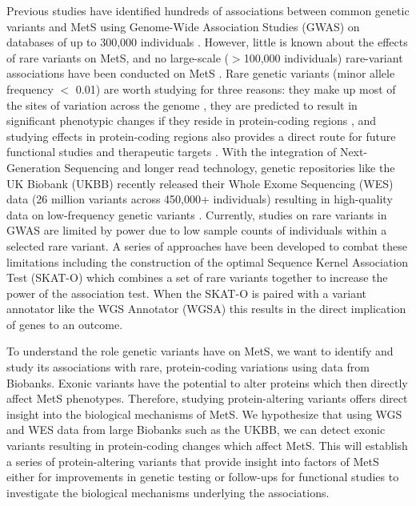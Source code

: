 \documentclass[11pt]{article}
\begin{document}
Previous studies have identified hundreds of associations between common genetic variants and MetS using Genome-Wide Association Studies (GWAS) on databases of up to 300,000 individuals \cite{pmid31589552}. However, little is known about the effects of rare variants on MetS, and no large-scale ($>$100,000 individuals) rare-variant associations have been conducted on MetS \cite{Lee2018}. Rare genetic variants (minor allele frequency $<$ 0.01) are worth studying for three reasons: they make up most of the sites of variation across the genome \cite{pmid34662886}, they are predicted to result in significant phenotypic changes if they reside in protein-coding regions \cite{pmid34662886}, and studying effects in protein-coding regions also provides a direct route for future functional studies and therapeutic targets \cite{doi:10.1056/NEJMoa2117872}. With the integration of Next-Generation Sequencing and longer read technology, genetic repositories like the UK Biobank (UKBB) recently released their Whole Exome Sequencing  (WES) data (26 million variants across 450,000+ individuals) resulting in high-quality data on low-frequency genetic variants \cite{pmid34662886}. Currently, studies on rare variants in GWAS are limited by power due to low sample counts of individuals within a selected rare variant. A series of approaches have been developed to combat these limitations including the construction of the optimal Sequence Kernel Association Test (SKAT-O) \cite{pmid22863193} which combines a set of rare variants together to increase the power of the association test. When the SKAT-O is paired with a variant annotator like the WGS Annotator (WGSA) \cite{pmid26395054} this results in the direct implication of genes to an outcome.

To understand the role genetic variants have on MetS, we want to identify and study its associations with rare, protein-coding variations using data from Biobanks. Exonic variants have the potential to alter proteins which then directly affect MetS phenotypes. Therefore, studying protein-altering variants offers direct insight into the biological mechanisms of MetS. We hypothesize that using WGS and WES data from large Biobanks such as the UKBB, we can detect exonic variants resulting in protein-coding changes which affect MetS. This will establish a series of protein-altering variants that provide insight into factors of MetS either for improvements in genetic testing or follow-ups for functional studies to investigate the biological mechanisms underlying the associations.
\end{document}
